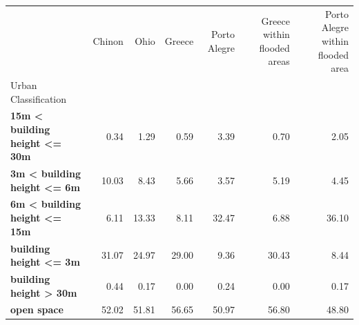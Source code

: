 \begin{tabular}{lrrrrrr}
\toprule
 & Chinon & Ohio & Greece & Porto Alegre & Greece within flooded areas & Porto Alegre within flooded area \\
Urban Classification &  &  &  &  &  &  \\
\midrule
\textbf{15m < building height <= 30m} & 0.34 & 1.29 & 0.59 & 3.39 & 0.70 & 2.05 \\
\textbf{3m < building height <= 6m} & 10.03 & 8.43 & 5.66 & 3.57 & 5.19 & 4.45 \\
\textbf{6m < building height <= 15m} & 6.11 & 13.33 & 8.11 & 32.47 & 6.88 & 36.10 \\
\textbf{building height <= 3m} & 31.07 & 24.97 & 29.00 & 9.36 & 30.43 & 8.44 \\
\textbf{building height > 30m} & 0.44 & 0.17 & 0.00 & 0.24 & 0.00 & 0.17 \\
\textbf{open space} & 52.02 & 51.81 & 56.65 & 50.97 & 56.80 & 48.80 \\
\bottomrule
\end{tabular}
